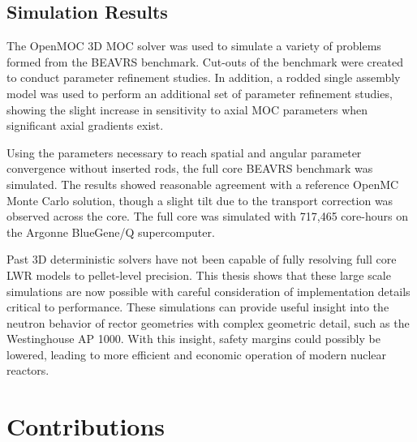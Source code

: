 \subsection{Simulation Results}
\label{sec:sub:sim-results}

The OpenMOC 3D \ac{MOC} solver was used to simulate a variety of problems formed from the BEAVRS benchmark. Cut-outs of the benchmark were created to conduct parameter refinement studies. In addition, a rodded single assembly model was used to perform an additional set of parameter refinement studies, showing the slight increase in sensitivity to axial \ac{MOC} parameters when significant axial gradients exist.

Using the parameters necessary to reach spatial and angular parameter convergence without inserted rods, the full core BEAVRS benchmark was simulated. The results showed reasonable agreement with a reference OpenMC Monte Carlo solution, though a slight tilt due to the transport correction was observed across the core. The full core was simulated with 717,465 core-hours on the Argonne BlueGene/Q supercomputer.

Past 3D deterministic solvers have not been capable of fully resolving full core \ac{LWR} models to pellet-level precision. This thesis shows that these large scale simulations are now possible with careful consideration of implementation details critical to performance. These simulations can provide useful insight into the neutron behavior of rector geometries with complex geometric detail, such as the Westinghouse AP 1000\texttrademark. With this insight, safety margins could possibly be lowered, leading to more efficient and economic operation of modern nuclear reactors.

\clearpage
\section{Contributions}
\label{sec:contributions}

